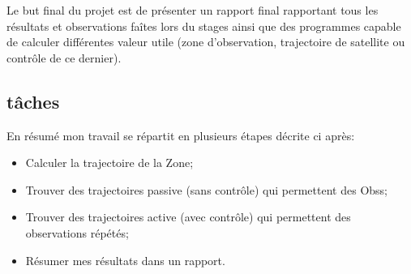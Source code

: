 \documentclass[12pt]{article} %
\begin{document}
		
		Le but final du projet est de présenter un rapport final rapportant tous les résultats et observations faîtes lors du stages ainsi que des programmes capable de calculer différentes valeur utile (zone d'observation, trajectoire de satellite ou contrôle de ce dernier).
		
		\subsection{tâches}
		En résumé mon travail se répartit en plusieurs étapes décrite ci après:
		\begin{itemize}
			\item Calculer la trajectoire de la \gls{Zone};
			\item Trouver des trajectoires passive (sans contrôle) qui permettent des \glspl{Obs};
			\item Trouver des trajectoires active (avec contrôle) qui permettent des observations répétés;
			\item Résumer mes résultats dans un rapport.
		\end{itemize}
		
\end{document}
